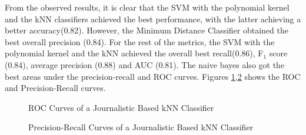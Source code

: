From the observed results, it is clear that the SVM with the polynomial kernel and the kNN classifiers achieved the best performance, with the latter achieving a better accuracy(0.82). However, the Minimum Distance Classifier obtained the best overall precision  (0.84). For the rest of the metrics, the SVM with the polynomial kernel and the kNN achieved the overall best recall(0.86), F$_1$ score (0.84), average precision (0.88) and AUC (0.81). The naive bayes also got the best areas under the precision-recall and ROC curves. Figures \ref{fig:theoretical-journalistic-relevance-roc},\ref{fig:theoretical-journalistic-relevance-pr} shows the ROC and Precision-Recall curves. 

\begin{figure}[H]
	\centering
	\caption[ROC Curves of a Journalistic Based kNN Classifier]{ROC Curves of a Journalistic Based kNN Classifier}
	\label{fig:theoretical-journalistic-relevance-roc}
\end{figure}

\begin{figure}[H]
	\centering
	\caption[Precision-Recall Curves of a Journalistic Based kNN Classifier]{Precision-Recall Curves of a Journalistic Based kNN Classifier}
	\label{fig:theoretical-journalistic-relevance-pr}
\end{figure}

